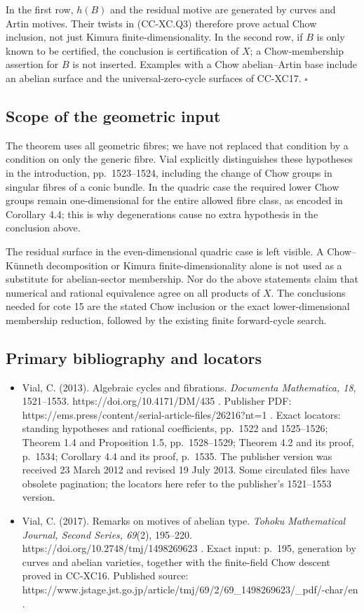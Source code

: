 In the first row, \(h(B)\) and the residual motive are generated by
curves and Artin motives. Their twists in (CC-XC.Q3) therefore prove
actual Chow inclusion, not just Kimura finite-dimensionality. In the
second row, if \(B\) is only known to be certified, the conclusion is
certification of \(X\); a Chow-membership assertion for \(B\) is not
inserted. Examples with a Chow abelian--Artin base include an abelian
surface and the universal-zero-cycle surfaces of CC-XC17. \(\square\)

\subsection{Scope of the geometric
input}\label{scope-of-the-geometric-input}

The theorem uses all geometric fibres; we have not replaced that
condition by a condition on only the generic fibre. Vial explicitly
distinguishes these hypotheses in the introduction, pp.~1523--1524,
including the change of Chow groups in singular fibres of a conic
bundle. In the quadric case the required lower Chow groups remain
one-dimensional for the entire allowed fibre class, as encoded in
Corollary 4.4; this is why degenerations cause no extra hypothesis in
the conclusion above.

The residual surface in the even-dimensional quadric case is left
visible. A Chow--Künneth decomposition or Kimura finite-dimensionality
alone is not used as a substitute for abelian-sector membership. Nor do
the above statements claim that numerical and rational equivalence agree
on all products of \(X\). The conclusions needed for cote 15 are the
stated Chow inclusion or the exact lower-dimensional membership
reduction, followed by the existing finite forward-cycle search.

\subsection{Primary bibliography and
locators}\label{primary-bibliography-and-locators}

\begin{itemize}
\tightlist
\item
  Vial, C. (2013). Algebraic cycles and fibrations. \emph{Documenta
  Mathematica, 18}, 1521--1553. https://doi.org/10.4171/DM/435 .
  Publisher PDF:
  https://ems.press/content/serial-article-files/26216?nt=1 . Exact
  locators: standing hypotheses and rational coefficients, pp.~1522 and
  1525--1526; Theorem 1.4 and Proposition 1.5, pp.~1528--1529; Theorem
  4.2 and its proof, p.~1534; Corollary 4.4 and its proof, p.~1535. The
  publisher version was received 23 March 2012 and revised 19 July 2013.
  Some circulated files have obsolete pagination; the locators here
  refer to the publisher's 1521--1553 version.
\item
  Vial, C. (2017). Remarks on motives of abelian type. \emph{Tohoku
  Mathematical Journal, Second Series, 69}(2), 195--220.
  https://doi.org/10.2748/tmj/1498269623 . Exact input: p.~195,
  generation by curves and abelian varieties, together with the
  finite-field Chow descent proved in CC-XC16. Published source:
  https://www.jstage.jst.go.jp/article/tmj/69/2/69\_1498269623/\_pdf/-char/en
  .
\end{itemize}
